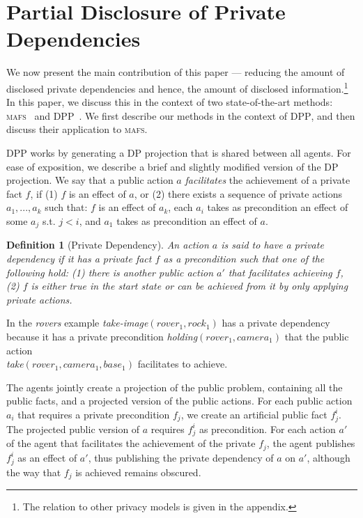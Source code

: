 \documentclass{article}
\newtheorem{definition}{Definition}
\newcommand{\mafs}{\textsc {mafs}\xspace}
\newcommand{\dpp}{\textsc {DPP}\xspace}
\newcommand{\roni}[1]{\textbf{\color{blue}[RONI:#1]}}
\theoremstyle{remark}
\begin{document}
\section{Partial Disclosure of Private Dependencies}

We now present the main contribution of this paper --- reducing the amount of disclosed private dependencies and hence, the amount of disclosed information.\footnote{The relation to other privacy models is given in the appendix.}
In this paper, we discuss this in the context of two state-of-the-art methods: \mafs~\cite{nissim2014distributed} and \dpp~\cite{maliah2018action}. 
We first describe our methods in the context of \dpp, and then discuss their application to \mafs .

\dpp works by generating a DP projection that is shared between all agents.  
For ease of exposition, we describe a brief and slightly modified version of the DP projection. We say that a public action $a$ {\em facilitates} the achievement of a private fact $f$, if (1) $f$ is an effect of $a$, or (2) there exists a sequence of private actions $a_1,...,a_k$ such that: $f$ is an effect of $a_k$,  each $a_i$ takes as precondition an effect of some $a_j$ s.t. $j<i$, and $a_1$ takes as precondition an effect of $a$.

\begin{definition}[Private Dependency]
An action $a$ is said to have a private dependency if it has a private fact $f$ as a precondition such that one of the following hold: (1) there is another public action $a'$ that facilitates achieving $f$,  (2) $f$ is either true in the start state or can be achieved from it by only applying private actions. 
\label{def:private-dependency}
\end{definition}

In the {\em rovers} example {\em take-image}$(rover_1,rock_1)$ 
has a private dependency because it has a private precondition  {\em holding}$(rover_1, camera_1)$
that the public action\\ {\em take}$(rover_1, camera_1, base_1)$ facilitates to achieve. 


The agents jointly create a projection of the public problem, containing all the public facts, and a projected version of the public actions.
For each public action $a_i$ that requires a private precondition $f_j$, we create an artificial public fact $f^i_j$. The projected public version of $a$ requires $f^i_j$ as precondition. For each action $a'$ of the agent that facilitates the achievement of the private $f_j$, the agent publishes $f^i_j$ as an effect of $a'$, thus publishing the private dependency of $a$ on $a'$, although the way that $f_j$ is achieved remains obscured. 
\end{document}
